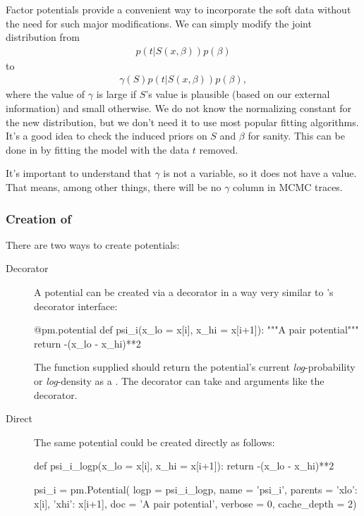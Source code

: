 \documentclass[]{jss}
\begin{document}
Factor potentials provide a convenient way to incorporate the soft data without the need for such major modifications. We can simply modify the joint distribution from
\begin{eqnarray*}
    p(t|S(x,\beta)) p(\beta)
\end{eqnarray*}
to
\begin{eqnarray*}
    \gamma(S) p(t|S(x,\beta)) p(\beta),
\end{eqnarray*}
where the value of $\gamma$ is large if $S$'s value is plausible (based on our external information) and small otherwise. We do not know the normalizing constant for the new distribution, but we don't need it to use most popular fitting algorithms. It's a good idea to check the induced priors on $S$ and $\beta$ for sanity. This can be done in  by fitting the model with the data $t$ removed.

It's important to understand that $\gamma$ is not a variable, so it does not have a value. That means, among other things, there will be no $\gamma$ column in MCMC traces.


\subsubsection[Creation of Potentials]{Creation of }
There are two ways to create potentials:
\begin{description}
    \item[Decorator] A potential can be created via a decorator in a way very similar to 's decorator interface:
\begin{CodeInput}
@pm.potential
def psi_i(x_lo = x[i], x_hi = x[i+1]):
"""A pair potential"""
return -(x_lo - x_hi)**2
\end{CodeInput}
The function supplied should return the potential's current \emph{log}-probability or \emph{log}-density as a  . The  decorator can take  and  arguments like the  decorator.
    \item[Direct] The same potential could be created directly as follows:
\begin{CodeInput}
def psi_i_logp(x_lo = x[i], x_hi = x[i+1]):
return -(x_lo - x_hi)**2

psi_i = pm.Potential(  logp = psi_i_logp,
                name = 'psi_i',
                parents = {'xlo': x[i], 'xhi': x[i+1]},
                doc = 'A pair potential',
                verbose = 0,
                cache_depth = 2)
\end{CodeInput}
\end{description}
\end{document}
